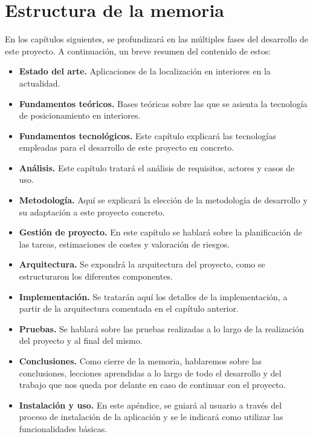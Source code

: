 \section{Estructura de la memoria}
En los capítulos siguientes, se profundizará en las múltiples fases del desarrollo de este proyecto. A continuación, un breve resumen del contenido de estos:
\begin{itemize}
\item \textbf{Estado del arte.} Aplicaciones de la localización en interiores en la actualidad.
\item \textbf{Fundamentos teóricos.} Bases teóricas sobre las que se asienta la tecnología de posicionamiento en interiores.
\item \textbf{Fundamentos tecnológicos.} Este capítulo explicará las tecnologías empleadas para el desarrollo de este proyecto en concreto.
\item \textbf{Análisis.} Este capítulo tratará el análisis de requisitos, actores y casos de uso.
\item \textbf{Metodología.} Aquí se explicará la elección de la metodología de desarrollo y su adaptación a este proyecto concreto.
\item \textbf{Gestión de proyecto.} En este capítulo se hablará sobre la planificación de las tareas, estimaciones de costes y valoración de riesgos.
\item \textbf{Arquitectura.} Se expondrá la arquitectura del proyecto, como se estructuraron los diferentes componentes.
\item \textbf{Implementación.} Se tratarán aquí los detalles de la implementación, a partir de la arquitectura comentada en el capítulo anterior.
\item \textbf{Pruebas.} Se hablará sobre las pruebas realizadas a lo largo de la realización del proyecto y al final del mismo.
\item \textbf{Conclusiones.} Como cierre de la memoria, hablaremos sobre las  conclusiones, lecciones aprendidas a lo largo de todo el desarrollo y del trabajo que nos queda por delante en caso de continuar con el proyecto.
\item{}\textbf{Instalación y uso.} En este apéndice, se guiará al usuario a través del proceso de instalación de la aplicación y se le indicará como utilizar las funcionalidades básicas.
\end{itemize}

